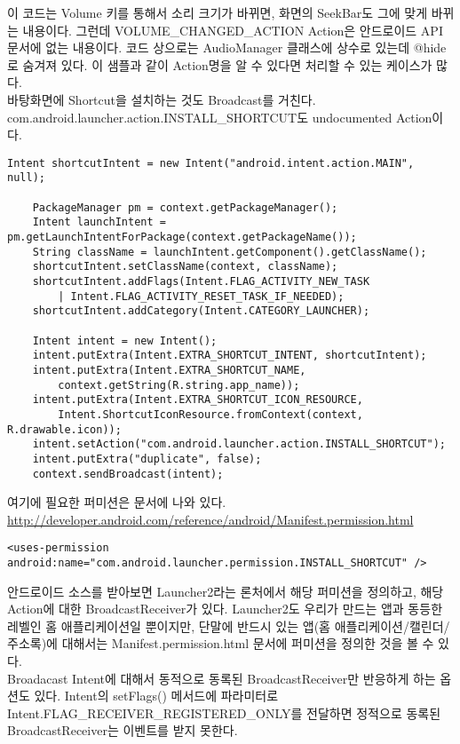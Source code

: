 이 코드는 Volume 키를 통해서 소리 크기가 바뀌면, 화면의 SeekBar도 그에 맞게 바뀌는 내용이다. 
그런데 VOLUME\_CHANGED\_ACTION Action은 안드로이드 API 문서에 없는 내용이다.
코드 상으로는 AudioManager 클래스에 상수로 있는데 @hide로 숨겨져 있다. 
이 샘플과 같이 Action명을 알 수 있다면 처리할 수 있는 케이스가 많다.\\

바탕화면에 Shortcut을 설치하는 것도 Broadcast를 거친다. com.android.launcher.action.INST\-ALL\_SH\-ORT\-CUT도 undocumented Action이다.
\begin{lstlisting}[frame=single] 
	Intent shortcutIntent = new Intent("android.intent.action.MAIN", null);
		
	PackageManager pm = context.getPackageManager();
	Intent launchIntent = pm.getLaunchIntentForPackage(context.getPackageName());
	String className = launchIntent.getComponent().getClassName();
	shortcutIntent.setClassName(context, className);
	shortcutIntent.addFlags(Intent.FLAG_ACTIVITY_NEW_TASK 
		| Intent.FLAG_ACTIVITY_RESET_TASK_IF_NEEDED);
	shortcutIntent.addCategory(Intent.CATEGORY_LAUNCHER);

	Intent intent = new Intent();
	intent.putExtra(Intent.EXTRA_SHORTCUT_INTENT, shortcutIntent);
	intent.putExtra(Intent.EXTRA_SHORTCUT_NAME,
		context.getString(R.string.app_name));
	intent.putExtra(Intent.EXTRA_SHORTCUT_ICON_RESOURCE,
		Intent.ShortcutIconResource.fromContext(context, R.drawable.icon));
	intent.setAction("com.android.launcher.action.INSTALL_SHORTCUT");
	intent.putExtra("duplicate", false);
	context.sendBroadcast(intent);
\end{lstlisting}
여기에 필요한 퍼미션은 문서에 나와 있다.
\url{http://developer.android.com/reference/android/Manifest.permission.html}
\begin{lstlisting}[frame=single] 
<uses-permission android:name="com.android.launcher.permission.INSTALL_SHORTCUT" />
\end{lstlisting}

안드로이드 소스를 받아보면 Launcher2라는 론처에서 해당 퍼미션을 정의하고, 해당 Action에 대한 BroadcastReceiver가 있다.
Launcher2도 우리가 만드는 앱과 동등한 레벨인 홈 애플리케이션일 뿐이지만, 단말에 반드시 있는 앱(홈 애플리케이션/캘린더/주소록)에 대해서는 Manifest.permission.html 문서에 퍼미션을 정의한 것을 볼 수 있다.\\

Broadacast Intent에 대해서 동적으로 동록된 BroadcastReceiver만 반응하게 하는 옵션도 있다. Intent의 setFlags() 메서드에 파라미터로 Intent.FLAG\_RECEIVER\_REGISTERED\_ONLY를 전달하면 정적으로 동록된 BroadcastReceiver는 이벤트를 받지 못한다.

